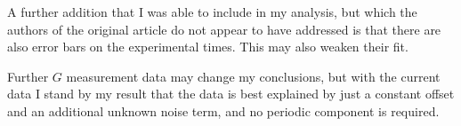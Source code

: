 \documentclass[comment]{epl2}
\begin{document}
A further addition that I was able to include in my analysis, but which the authors of the original 
article do not appear to have addressed is that there are also error bars on the
experimental times. This may also weaken their fit.

Further $G$ measurement data may change my conclusions, but with the current data I stand by my 
result that the data is best explained by just a constant offset and an additional unknown 
noise term, and no periodic component is required.



\end{document}
